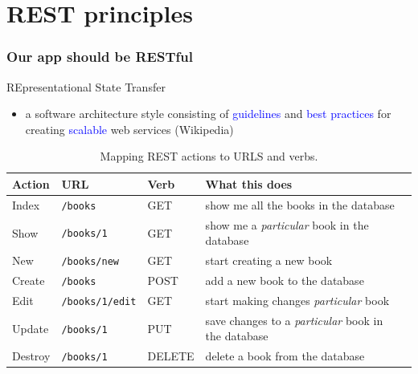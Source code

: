 \documentclass[10pt,t,xcolor=dvipsnames]{beamer}
\begin{document}
\section{REST principles}
\begin{frame}[fragile]
\frametitle{Our app should be RESTful}
\pause
\alert{RE}presentational \alert{S}tate \alert{T}ransfer
\pause
\begin{itemize}[<+->]
\item a software architecture style consisting of \textcolor{blue}{guidelines} and \textcolor{blue}{best practices} for creating \textcolor{blue}{scalable} web services (Wikipedia)
\end{itemize}
\pause
\begin{table}
\scriptsize
\centering
\begin{tabular}{|l|l|l|l|l|}\hline
Action  &URL&                  Verb  & What this does\\ \hline\hline
Index&  \texttt{/books}&       GET & show me all the books in the database\\ \hline
Show&   \texttt{/books/1}&     GET & show me a \textit{\alert{particular}} book in the database\\ \hline
New&    \texttt{/books/new}&   GET & start creating a new book\\ \hline
Create& \texttt{/books}&       POST & add a new book to the database\\ \hline
Edit&   \texttt{/books/1/edit}&GET & start making changes \textit{\alert{particular}} book \\ \hline
Update& \texttt{/books/1}&     PUT & save changes to a \textit{\alert{particular}} book in the database\\ \hline
Destroy&\texttt{/books/1}&     DELETE & delete a book from the database\\ \hline
\end{tabular}
\caption{\footnotesize Mapping REST actions to URLS and verbs.}
\end{table}
\end{frame}
\end{document}
